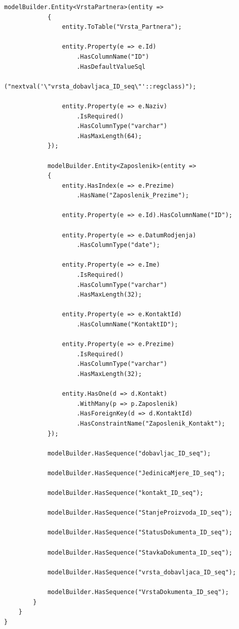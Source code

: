\documentclass[a4paper,12pt]{foi}
\begin{document}
\begin{lstlisting}[language={[Sharp]C}]
            modelBuilder.Entity<VrstaPartnera>(entity =>
            {
                entity.ToTable("Vrsta_Partnera");

                entity.Property(e => e.Id)
                    .HasColumnName("ID")
                    .HasDefaultValueSql
                    ("nextval('\"vrsta_dobavljaca_ID_seq\"'::regclass)");

                entity.Property(e => e.Naziv)
                    .IsRequired()
                    .HasColumnType("varchar")
                    .HasMaxLength(64);
            });

            modelBuilder.Entity<Zaposlenik>(entity =>
            {
                entity.HasIndex(e => e.Prezime)
                    .HasName("Zaposlenik_Prezime");

                entity.Property(e => e.Id).HasColumnName("ID");

                entity.Property(e => e.DatumRodjenja)
                	.HasColumnType("date");

                entity.Property(e => e.Ime)
                    .IsRequired()
                    .HasColumnType("varchar")
                    .HasMaxLength(32);

                entity.Property(e => e.KontaktId)
                	.HasColumnName("KontaktID");

                entity.Property(e => e.Prezime)
                    .IsRequired()
                    .HasColumnType("varchar")
                    .HasMaxLength(32);

                entity.HasOne(d => d.Kontakt)
                    .WithMany(p => p.Zaposlenik)
                    .HasForeignKey(d => d.KontaktId)
                    .HasConstraintName("Zaposlenik_Kontakt");
            });

            modelBuilder.HasSequence("dobavljac_ID_seq");

            modelBuilder.HasSequence("JedinicaMjere_ID_seq");

            modelBuilder.HasSequence("kontakt_ID_seq");

            modelBuilder.HasSequence("StanjeProizvoda_ID_seq");

            modelBuilder.HasSequence("StatusDokumenta_ID_seq");

            modelBuilder.HasSequence("StavkaDokumenta_ID_seq");

            modelBuilder.HasSequence("vrsta_dobavljaca_ID_seq");

            modelBuilder.HasSequence("VrstaDokumenta_ID_seq");
        }
    }
}

\end{lstlisting}
\end{document}
